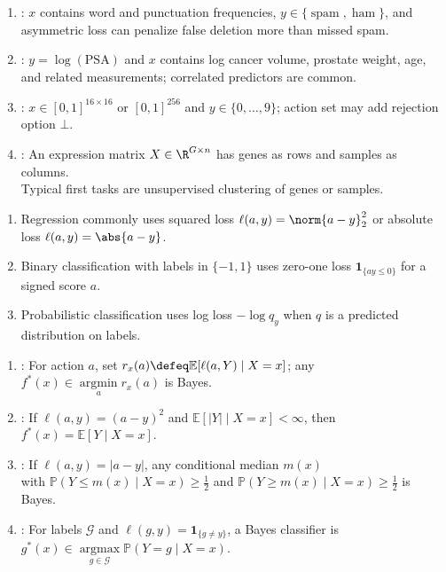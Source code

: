 \begin{example} \label{ex:sl-source-learning-problems} 
\begin{enumerate}[label=(\roman*)]
\setlength{\itemsep}{0pt}
\item {}: $x$ contains word and punctuation frequencies, $y\in\{\operatorname{spam},\operatorname{ham}\}$, and asymmetric loss can penalize false deletion more than missed spam.
\item {}: $y=\log(\mathrm{PSA})$ and $x$ contains log cancer volume, prostate weight, age, and related measurements; correlated predictors are common.
\item {}: $x\in[0,1]^{16\times16}$ or $[0,1]^{256}$ and $y\in\{0,\ldots,9\}$; action set may add rejection option $\bot$.
\item {}: An expression matrix $X\in\R^{G\times n}$ has genes as rows and samples as columns.\\
Typical first tasks are unsupervised clustering of genes or samples.
\end{enumerate}
\end{example}

\begin{example} \label{ex:sl-standard-losses} 
\begin{enumerate}[label=(\roman*)]
\setlength{\itemsep}{0pt}
\item Regression commonly uses squared loss $\ell(a,y)=\norm{a-y}_2^2$ or absolute loss $\ell(a,y)=\abs{a-y}$.
\item Binary classification with labels in $\{-1,1\}$ uses zero-one loss $\mathbf{1}_{\{ay\leq0\}}$ for a signed score $a$.
\item Probabilistic classification uses log loss $-\log q_y$ when $q$ is a predicted distribution on labels.
\end{enumerate}
\end{example}

\begin{definition} \label{def:sl-bayes-predictor} 
\begin{enumerate}[label=(\roman*)]
\setlength{\itemsep}{0pt}
\item {}: For action $a$, set $r_x(a)\defeq\mathbb{E}[\ell(a,Y)\mid X=x]$; any $f^*(x)\in\operatorname*{argmin}\limits_a r_x(a)$ is Bayes.
\item {}: If $\ell(a,y)=(a-y)^2$ and $\mathbb{E}[|Y|\mid X=x]<\infty$, then $f^*(x)=\mathbb{E}[Y\mid X=x]$.
\item {}: If $\ell(a,y)=|a-y|$, any conditional median $m(x)$\\
with $\mathbb{P}(Y\leq m(x)\mid X=x)\geq\frac12$ and $\mathbb{P}(Y\geq m(x)\mid X=x)\geq\frac12$ is Bayes.
\item {}: For labels $\mathcal{G}$ and $\ell(g,y)=\mathbf{1}_{\{g\neq y\}}$, a Bayes classifier is $g^*(x)\in\operatorname*{argmax}\limits_{g\in\mathcal{G}}\mathbb{P}(Y=g\mid X=x)$.
\end{enumerate}
\end{definition}

